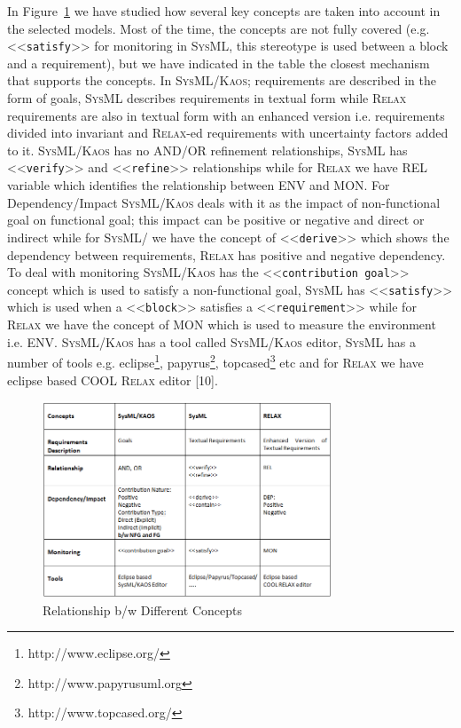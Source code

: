 \documentclass[10pt, conference, compsocconf]{IEEEtran}
\def\myrelax{\textsc{Relax}}                  %
\def\sysml{\textsc{SysML}}
\def\kaos{\textsc{Kaos}}
\newcommand{\Myfig}[1]{Figure~\ref{fig:#1}}
\newcommand{\stereotype}[1]{\textless\textless\texttt{#1}\textgreater\textgreater}
\begin{document}
In \Myfig{Relationship} we have studied how several key concepts are taken into account in the selected models. Most of the time, the concepts are not fully covered (e.g. \stereotype{satisfy} for monitoring in \sysml{}, this stereotype is used between a block and a requirement), but we have indicated in the table the closest mechanism that supports the concepts. In \sysml{}/\kaos{}; requirements are described in the form of goals, \sysml{} describes requirements in textual form while \myrelax{} requirements are also in textual form with an enhanced version i.e. requirements divided into invariant and \myrelax{}-ed requirements with uncertainty factors added to it. \sysml{}/\kaos{} has no AND/OR refinement relationships, \sysml{} has \stereotype{verify} and \stereotype{refine} relationships while for \myrelax{} we have REL variable which identifies the relationship between ENV and MON. For Dependency/Impact \sysml{}/\kaos{} deals with it as the impact of non-functional goal on functional goal; this impact can be positive or negative and direct or indirect while for \sysml{}/ we have the concept of \stereotype{derive} which shows the dependency between requirements, \myrelax{} has positive and negative dependency. To deal with monitoring \sysml{}/\kaos{} has the \stereotype{contribution goal} concept which is used to satisfy a non-functional goal, \sysml{} has \stereotype{satisfy} which is  used when a \stereotype{block} satisfies a \stereotype{requirement} while for \myrelax{} we have the concept of MON which is used to measure the environment i.e. ENV. \sysml{}/\kaos{} has a tool called \sysml{}/\kaos{} editor, \sysml{} has a number of tools e.g. eclipse\footnote{http://www.eclipse.org/}, papyrus\footnote{http://www.papyrusuml.org}, topcased\footnote{http://www.topcased.org/} etc and for \myrelax{} we have eclipse based COOL \myrelax{} editor [10]. 

\begin{figure}[!t]
\centering
\includegraphics[width=3.4in]{fig13}
\caption{Relationship b/w Different Concepts}
\label{fig:Relationship}
\end{figure}
\end{document}
